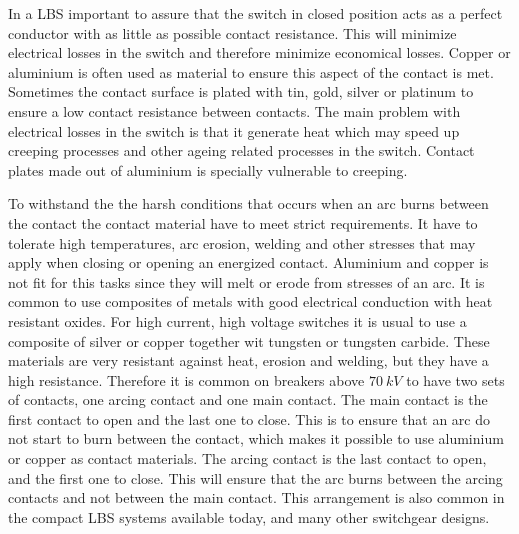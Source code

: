\documentclass[10pt,a4paper]{article}
\begin{document}
In a LBS important to assure that the switch in closed position acts as a perfect conductor with as little as possible contact resistance. This will minimize electrical losses in the switch and therefore minimize economical losses. Copper or aluminium is often used as material to ensure this aspect of the contact is met. Sometimes the contact surface is plated with tin, gold, silver or platinum to ensure a low contact resistance between contacts. The main problem with electrical losses in the switch is that it generate heat which may speed up creeping processes and other ageing related processes in the switch. Contact plates made out of aluminium is specially vulnerable to creeping. 

To withstand the the harsh conditions that occurs when an arc burns between the contact the contact material have to meet strict requirements. It have to tolerate high temperatures, arc erosion, welding and other stresses that may apply when closing or opening an energized contact. Aluminium and copper is not fit for this tasks since they will melt or erode from stresses of an arc. It is common to use composites of metals with good electrical conduction with heat resistant oxides. For high current, high voltage switches it is usual to use a composite of silver or copper together wit tungsten or tungsten carbide. These materials are very resistant against heat, erosion and welding, but they have a high resistance. Therefore it is common on breakers above $70 \ kV$ to have two sets of contacts, one arcing contact and one main contact. The main contact is the first contact to open and the last one to close. This is to ensure that an arc do not start to burn between the contact, which makes it possible to use aluminium or copper as contact materials. The arcing contact is the last contact to open, and the first one to close. This will ensure that the arc burns between the arcing contacts and not between the main contact. This arrangement is also common in the compact LBS systems available today, and many other switchgear designs.
\end{document}
